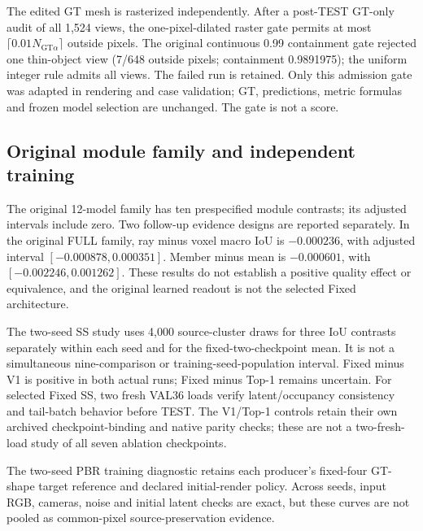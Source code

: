 The edited GT mesh is rasterized independently. After a post-TEST GT-only
audit of all 1,524 views, the one-pixel-dilated raster gate permits at most
$\lceil0.01N_{\mathrm{GT}\alpha}\rceil$ outside pixels. The original
continuous 0.99 containment gate rejected one thin-object view (7/648
outside pixels; containment 0.9891975); the uniform integer rule admits all
views. The failed run is retained. Only this admission gate was adapted in
rendering and case validation; GT, predictions, metric formulas and frozen
model selection are unchanged. The gate is not a score.

\subsection{Original module family and independent training}



The original 12-model family has ten prespecified module contrasts; its
adjusted intervals include zero. Two follow-up evidence designs are reported
separately. In the original FULL family, ray minus voxel macro IoU is
$-0.000236$, with adjusted interval $[-0.000878,0.000351]$. Member minus mean
is $-0.000601$, with $[-0.002246,0.001262]$. These results do not establish a
positive quality effect or equivalence, and the original learned readout is
not the selected Fixed architecture.

The two-seed SS study uses 4,000 source-cluster draws for three IoU contrasts
separately within each seed and for the fixed-two-checkpoint mean. It is not
a simultaneous nine-comparison or training-seed-population interval. Fixed
minus V1 is positive in both actual runs; Fixed minus Top-1 remains uncertain.
For selected Fixed SS, two fresh VAL36 loads verify latent/occupancy
consistency and tail-batch behavior before TEST. The V1/Top-1 controls retain
their own archived checkpoint-binding and native parity checks; these are
not a two-fresh-load study of all seven ablation checkpoints.


The two-seed PBR training diagnostic retains each producer's fixed-four
GT-shape target reference and declared initial-render policy. Across seeds,
input RGB, cameras, noise and initial latent checks are exact, but these
curves are not pooled as common-pixel source-preservation evidence.

